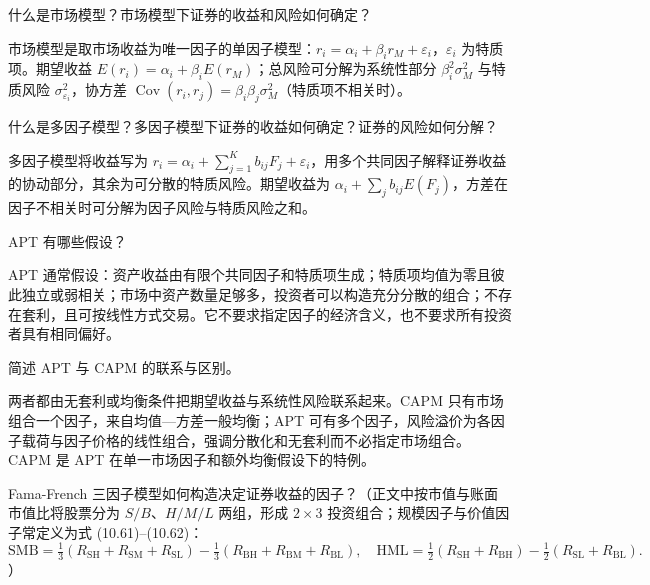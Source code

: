 
\begin{problem}
 什么是市场模型？市场模型下证券的收益和风险如何确定？
\end{problem}
\begin{solution}
市场模型是取市场收益为唯一因子的单因子模型：$r_i=\alpha_i+\beta_i r_M+\varepsilon_i$，$\varepsilon_i$ 为特质项。期望收益 $E(r_i)=\alpha_i+\beta_i E(r_M)$；总风险可分解为系统性部分 $\beta_i^2\sigma_M^2$ 与特质风险 $\sigma_{\varepsilon_i}^2$，协方差 $\operatorname{Cov}(r_i,r_j)=\beta_i\beta_j\sigma_M^2$（特质项不相关时）。
\end{solution}
\begin{problem}
 什么是多因子模型？多因子模型下证券的收益如何确定？证券的风险如何分解？
\end{problem}
\begin{solution}
多因子模型将收益写为 $r_i=\alpha_i+\sum_{j=1}^K b_{ij}F_j+\varepsilon_i$，用多个共同因子解释证券收益的协动部分，其余为可分散的特质风险。期望收益为 $\alpha_i+\sum_j b_{ij}E(F_j)$，方差在因子不相关时可分解为因子风险与特质风险之和。
\end{solution}
\begin{problem}
 APT 有哪些假设？
\end{problem}
\begin{solution}
APT 通常假设：资产收益由有限个共同因子和特质项生成；特质项均值为零且彼此独立或弱相关；市场中资产数量足够多，投资者可以构造充分分散的组合；不存在套利，且可按线性方式交易。它不要求指定因子的经济含义，也不要求所有投资者具有相同偏好。
\end{solution}
\begin{problem}
 简述 APT 与 CAPM 的联系与区别。
\end{problem}
\begin{solution}
两者都由无套利或均衡条件把期望收益与系统性风险联系起来。CAPM 只有市场组合一个因子，来自均值—方差一般均衡；APT 可有多个因子，风险溢价为各因子载荷与因子价格的线性组合，强调分散化和无套利而不必指定市场组合。CAPM 是 APT 在单一市场因子和额外均衡假设下的特例。
\end{solution}
\begin{problem}
 Fama-French 三因子模型如何构造决定证券收益的因子？（正文中按市值与账面市值比将股票分为 $S/B$、$H/M/L$ 两组，形成 $2\times3$ 投资组合；规模因子与价值因子常定义为式 (10.61)--(10.62)：
\[
    \mathrm{SMB}=\tfrac13(R_{\mathrm{SH}}+R_{\mathrm{SM}}+R_{\mathrm{SL}})-\tfrac13(R_{\mathrm{BH}}+R_{\mathrm{BM}}+R_{\mathrm{BL}}),\quad
    \mathrm{HML}=\tfrac12(R_{\mathrm{SH}}+R_{\mathrm{BH}})-\tfrac12(R_{\mathrm{SL}}+R_{\mathrm{BL}}).
\]
）
\end{problem}
